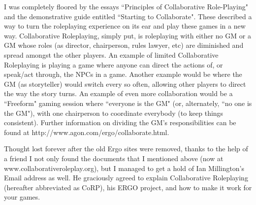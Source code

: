 \documentclass[twoside]{book}
\begin{document}
I was completely floored by the essays ``Principles of Collaborative Role-Playing" and the demonstrative guide entitled ``Starting to Collaborate". These described a way to turn the roleplaying experience on its ear and play these games in a new way. Collaborative Roleplaying, simply put, is roleplaying with either no GM or a GM whose roles (as director, chairperson, rules lawyer, etc) are diminished and spread amongst the other players. An example of limited Collaborative Roleplaying is playing a game where anyone can direct the actions of, or speak/act through, the NPCs in a game. Another example would be where the GM (as storyteller) would switch every so often, allowing other players to direct the way the story turns. An example of even more collaboration would be a ``Freeform" gaming session where ``everyone is the GM" (or, alternately, ``no one is the GM"), with one chairperson to coordinate everybody (to keep things consistent). Further information on dividing the GM's responsibilities can be found at http://www.agon.com/ergo/collaborate.html.

Thought lost forever after the old Ergo sites were removed, thanks to the help of a friend I not only found the documents that I mentioned above (now at www.collaborativeroleplay.org), but I managed to get a hold of Ian Millington's Email address as well. He graciously agreed to explain Collaborative Roleplaying (hereafter abbreviated as CoRP), his ERGO project, and how to make it work for your games.
\end{document}
